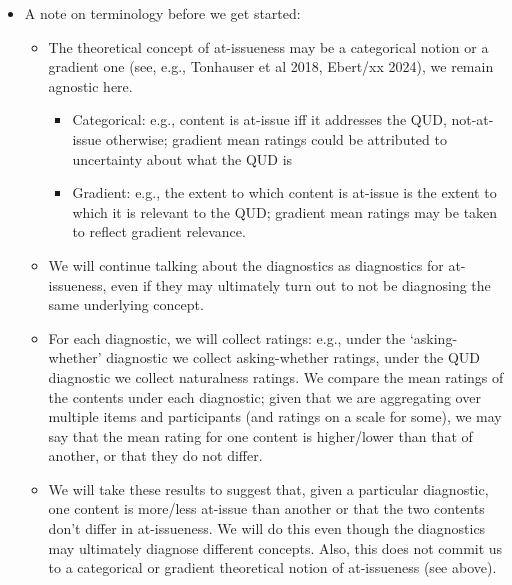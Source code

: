 \documentclass[times,linguex,xcolor]{glossa}
\begin{document}
\begin{itemize}[leftmargin=12pt]
\item A note on terminology before we get started:

\begin{itemize}

\item The theoretical concept of at-issueness may be a categorical notion or a gradient one (see, e.g., Tonhauser et al 2018, Ebert/xx 2024), we remain agnostic here.

\begin{itemize}

\item Categorical: e.g., content is at-issue iff it addresses the QUD, not-at-issue otherwise; gradient mean ratings could be attributed to uncertainty about what the QUD is

\item Gradient: e.g., the extent to which content is at-issue is the extent to which it is relevant to the QUD; gradient mean ratings may be taken to reflect gradient relevance.

\end{itemize}

\item We will continue talking about the diagnostics as diagnostics for at-issueness, even if they may ultimately turn out to not be diagnosing the same underlying concept.

\item For each diagnostic, we will collect ratings: e.g., under the `asking-whether' diagnostic we collect asking-whether ratings, under the QUD diagnostic we collect naturalness ratings. We compare the mean ratings of the contents under each diagnostic; given that we are aggregating over multiple items and participants (and ratings on a scale for some), we may say that the mean rating for one content is higher/lower than that of another, or that they do not differ. 

\item We will take these results to suggest that, given a particular diagnostic, one content is more/less at-issue than another or that the two contents don't differ in at-issueness. We will do this even though the diagnostics may ultimately diagnose different concepts. Also, this does not commit us to a categorical or gradient theoretical notion of at-issueness (see above).

\end{itemize}

\end{itemize} 

\end{document}
